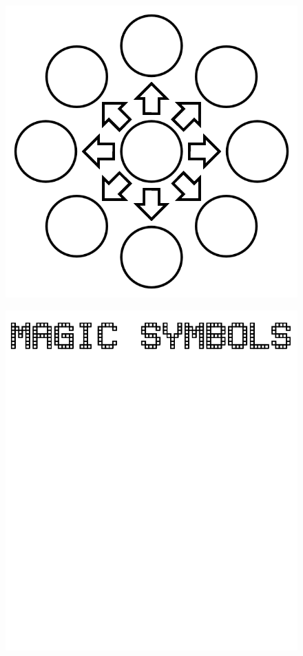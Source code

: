 \documentclass[17pt]{extreport}
\begin{document}
	\begin{figure}
		\centering
		\includegraphics[width=7.5in]{imageserver/uploadimages/image12.png}
	\end{figure}
	\begin{figure}
		\centering
		\includegraphics[width=7.5in]{imageserver/uploadimages/magicsymbols.png}
	\end{figure}	
\end{document}
